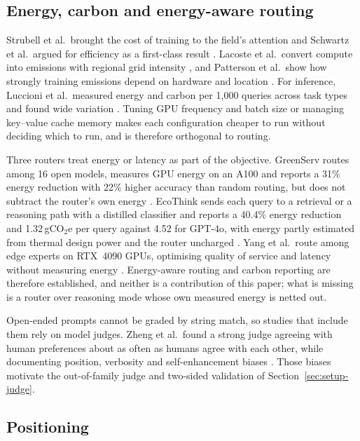 \subsection{Energy, carbon and energy-aware routing}
\label{sec:related-energy}

Strubell et al.\ brought the cost of training to the field's attention
\cite{strubell2019energy} and Schwartz et al.\ argued for efficiency as a
first-class result \cite{schwartz2020greenai}. Lacoste et al.\ convert
compute into emissions with regional grid intensity
\cite{lacoste2019quantifying}, and Patterson et al.\ show how strongly
training emissions depend on hardware and location \cite{patterson2021carbon}.
For inference, Luccioni et al.\ measured energy and carbon per 1{,}000
queries across task types and found wide variation
\cite{luccioni2024powerhungry}. Tuning GPU frequency and batch size
\cite{xu2025camel} or managing key--value cache memory \cite{kwon2023vllm}
makes each configuration cheaper to run without deciding which to run, and is
therefore orthogonal to routing.

Three routers treat energy or latency as part of the objective. GreenServ
routes among 16 open models, measures GPU energy on an A100 and reports a
31\% energy reduction with 22\% higher accuracy than random routing, but does
not subtract the router's own energy \cite{ziller2026greenserv}. EcoThink
sends each query to a retrieval or a reasoning path with a distilled
classifier and reports a 40.4\% energy reduction and 1.32\,gCO$_2$e per query
against 4.52 for GPT-4o, with energy partly estimated from thermal design
power and the router uncharged \cite{li2026ecothink}. Yang et al.\ route
among edge experts on RTX~4090 GPUs, optimising quality of service and
latency without measuring energy \cite{yang2025qosrouting}. Energy-aware
routing and carbon reporting are therefore established, and neither is a
contribution of this paper; what is missing is a router over reasoning mode
whose own measured energy is netted out.

Open-ended prompts cannot be graded by string match, so studies that include
them rely on model judges. Zheng et al.\ found a strong judge agreeing with
human preferences about as often as humans agree with each other, while
documenting position, verbosity and self-enhancement biases
\cite{zheng2023judging}. Those biases motivate the out-of-family judge and
two-sided validation of Section~\ref{sec:setup-judge}.

\subsection{Positioning}
\label{sec:related-gap}

